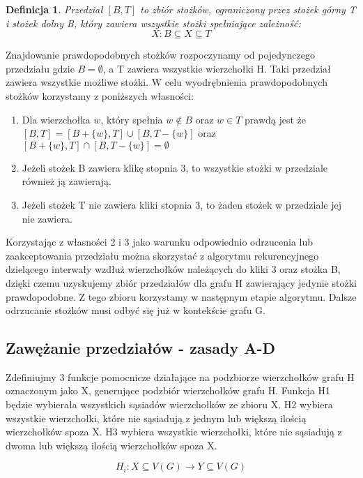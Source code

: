 \documentclass[11pt]{article}
\newtheorem{definition}{Definicja}[section]
\begin{document}
\begin{definition}
Przedział $[B, T]$ to zbiór stożków, ograniczony przez stożek górny T i stożek dolny B, który zawiera wszystkie stożki spełniające zależność:  $$X: B \subseteq X \subseteq T$$ 
\end{definition}


Znajdowanie prawdopodobnych stożków rozpoczynamy od pojedynczego przedziału gdzie $B = \emptyset$, a T zawiera wszystkie wierzchołki H. Taki przedział zawiera wszystkie możliwe stożki. W celu wyodrębnienia prawdopodobnych stożków korzystamy z poniższych własności:
\begin{enumerate}
\item Dla wierzchołka $w$, który spełnia $w \notin B$ oraz $w\in T$ prawdą jest że $[B, T] = [B + \{ w\}, T] \cup [B , T - \{ w\}]$ oraz $[B +\{ w\}, T] \cap [B , T - \{ w\}] = \emptyset$

\item Jeżeli stożek B zawiera klikę stopnia 3, to wszystkie stożki w przedziale również ją zawierają. 

\item Jeżeli stożek T nie zawiera kliki stopnia 3, to żaden stożek w przedziale jej nie zawiera.
\end{enumerate}

Korzystając z własności 2 i 3 jako warunku odpowiednio odrzucenia lub zaakceptowania przedziału można skorzystać z algorytmu rekurencyjnego dzielącego interwały wzdłuż wierzchołków należących do kliki 3 oraz stożka B, dzięki czemu uzyskujemy zbiór przedziałów dla grafu H zawierający jedynie stożki prawdopodobne. Z tego zbioru korzystamy w następnym etapie algorytmu.
Dalsze odrzucanie stożków musi odbyć się już w kontekście grafu G.
  

\subsection{Zawężanie przedziałów - zasady A-D}
Zdefiniujmy 3 funkcje pomocnicze działające na podzbiorze wierzchołków grafu H oznaczonym jako X, generujące podzbiór wierzchołków grafu H. 
Funkcja H1 będzie wybierała wszystkich sąsiadów wierzchołków ze zbioru X.
H2 wybiera wszystkie wierzchołki, które nie sąsiadują z jednym lub większą ilością wierzchołków spoza X. 
H3 wybiera wszystkie wierzchołki, które nie sąsiadują z dwoma lub większą ilością wierzchołków spoza X.

$$H_i: X \subseteq V(G) \to Y \subseteq V(G)$$
\end{document}
